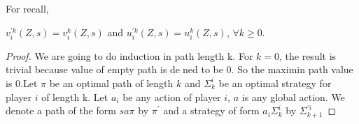 For recall,

\begin{theorem}
	$v_i^{'k}(Z,s)=v_i^{k}(Z,s)$ and $u_i^{'k}(Z,s)=u_i^{k}(Z,s)$, $ \forall k \ge 0 $.
\end{theorem}

\begin{proof}
	
	We are going to do induction in path length k. For $k = 0$, the result
	is trivial because value of empty path is dened to be 0. So the maximin path
	value is $0$.Let $\pi$ be an optimal path of length $k$ and $\Sigma^{i}_k$ be an optimal strategy for player $i$ of length k. Let $a_i$ be any action of player $i$, $a$ is any global action.	We denote a path of the form $sa\pi$ by $\pi^{'}$
	and a strategy of form $a_i\Sigma^{i}_k$ by $\Sigma^{'i}_{k+1}$
	
	

\end{proof}
